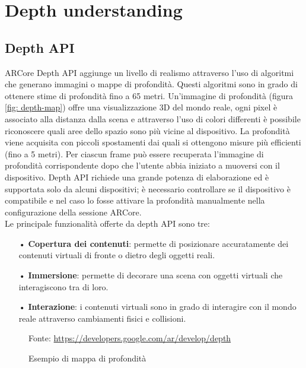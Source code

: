 \documentclass[crop=false, class=book]{standalone}
\begin{document}
		
	\chapter{Depth understanding}
	
		\section{Depth API}
	
			ARCore Depth API aggiunge un livello di realismo attraverso l'uso di algoritmi che generano immagini o mappe di 				profondità. Questi algoritmi sono in grado di ottenere stime di profondità fino a 65 metri. Un'immagine di 						profondità 	(figura \vref{fig: depth-map}) offre una visualizzazione 3D del mondo reale, ogni pixel è 							associato alla distanza dalla scena e attraverso l'uso di colori differenti è possibile riconoscere quali aree 					dello spazio sono più vicine al dispositivo. La profondità viene acquisita con piccoli spostamenti dai quali si 				ottengono misure più efficienti (fino a 5 metri). Per ciascun frame può essere recuperata 										l'immagine di profondità corrispondente dopo che l'utente abbia iniziato a muoversi con il dispositivo. Depth API 				richiede una grande potenza di elaborazione ed è supportata solo da alcuni dispositivi; è necessario controllare se 			il dispositivo è compatibile e nel caso lo fosse attivare la profondità manualmente nella configurazione della 					sessione ARCore.\\
		 	Le principale funzionalità offerte da depth API sono tre:
		\begin{itemize}
			\item[•] \textbf{Copertura dei contenuti}: permette di posizionare accuratamente dei contenuti virtuali di fronte o dietro degli oggetti reali.
			\item[•] \textbf{Immersione}: permette di decorare una scena con oggetti virtuali che interagiscono tra di loro.
			\item[•] \textbf{Interazione}: i contenuti virtuali sono in grado di interagire con il mondo reale attraverso cambiamenti fisici e collisioni.
		\end{itemize}
		
			\begin{figure}
				\centering
				{Fonte: \url{https://developers.google.com/ar/develop/depth}}
				\caption{Esempio di mappa di profondità}
				\label{fig: depth-map}
			\end{figure}	
		
\end{document}
